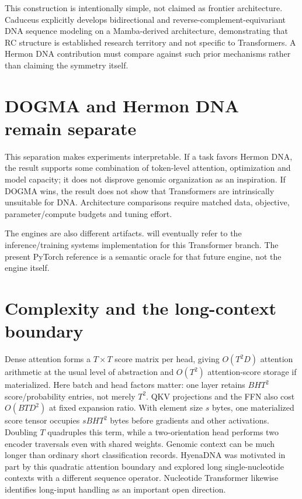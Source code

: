 
This construction is intentionally simple, not claimed as frontier architecture.
Caduceus explicitly develops bidirectional and reverse-complement-equivariant DNA
sequence modeling on a Mamba-derived architecture, demonstrating that RC structure
is established research territory and not specific to Transformers. \cite{caduceus}
A Hermon DNA contribution must compare against such prior mechanisms rather than
claiming the symmetry itself.

\section{DOGMA and Hermon DNA remain separate}


This separation makes experiments interpretable. If a task favors Hermon DNA, the
result supports some combination of token-level attention, optimization and model
capacity; it does not disprove genomic organization as an inspiration. If DOGMA
wins, the result does not show that Transformers are intrinsically unsuitable for
DNA. Architecture comparisons require matched data, objective, parameter/compute
budgets and tuning effort.

The engines are also different artifacts.  will eventually
refer to the inference/training systems implementation for this Transformer branch.
The present PyTorch reference is a semantic oracle for that future engine, not the
engine itself.

\section{Complexity and the long-context boundary}

Dense attention forms a $T\times T$ score matrix per head, giving $O(T^2D)$
attention arithmetic at the usual level of abstraction and $O(T^2)$ attention-score
storage if materialized. Here batch and head factors matter: one layer retains
$BHT^2$ score/probability entries, not merely $T^2$. QKV projections and the FFN
also cost $O(BTD^2)$ at fixed expansion ratio. With element size $s$ bytes,
one materialized score tensor occupies $sBHT^2$ bytes before gradients and other
activations. Doubling $T$ quadruples this term, while a two-orientation head
performs two encoder traversals even with shared weights.
Genomic context can be much longer than ordinary short
classification records. HyenaDNA was motivated in part by this quadratic attention
boundary and explored long single-nucleotide contexts with a different sequence
operator. Nucleotide Transformer likewise identifies long-input handling as an
important open direction. \cite{hyenadna,nt2025}


